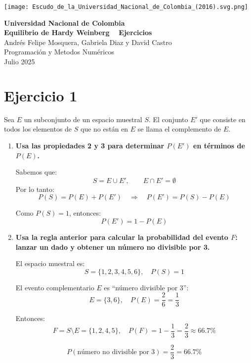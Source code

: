 \documentclass{article}
\begin{document}
\begin{titlepage}
    \begin{center}
        \vspace*{1cm}
        
        \texttt{[image: Escudo\_de\_la\_Universidad\_Nacional\_de\_Colombia\_(2016).svg.png]}
        
        \vspace{0.5cm}
        
        {\Large\textbf{Universidad Nacional de Colombia}}\\[1.5cm]
        
        {\Huge\textbf{Equilibrio de Hardy Weinberg ~ Ejercicios }}\\[2cm]
    
        
        {\large Andrés Felipe Mosquera, Gabriela Diaz y David Castro}\\[2cm]
        
        {\large Programación y Metodos Numéricos}\\[1.5cm]
        
        {\large Julio 2025}
        
    \end{center}
\end{titlepage}
\section*{Ejercicio 1}

Sea $E$ un subconjunto de un espacio muestral $S$. El conjunto $E'$ que consiste en todos los elementos de $S$ que no están en $E$ se llama el complemento de $E$.

\begin{enumerate}[label=\alph*)]
    \item \textbf{Usa las propiedades 2 y 3 para determinar $P(E')$ en términos de $P(E)$.}

    Sabemos que:
    \[
    S = E \cup E', \qquad E \cap E' = \emptyset
    \]
    Por lo tanto:
    \[
    P(S) = P(E) + P(E') \quad \Rightarrow \quad P(E') = P(S) - P(E)
    \]

    Como $P(S) = 1$, entonces:
    \[
    \boxed{P(E') = 1 - P(E)}
    \]

    \item \textbf{Usa la regla anterior para calcular la probabilidad del evento $F$: lanzar un dado y obtener un número no divisible por 3.}

    El espacio muestral es:
    \[
    S = \{1,2,3,4,5,6\}, \quad P(S) = 1
    \]

    El evento complementario $E$ es “número divisible por 3”:
    \[
    E = \{3,6\}, \quad P(E) = \frac{2}{6} = \frac{1}{3}
    \]

    Entonces:
    \[
    F = S \setminus E = \{1,2,4,5\}, \quad P(F) = 1 - \frac{1}{3} = \frac{2}{3} \approx 66.7\%
    \]

    \[
    \boxed{P(\text{número no divisible por 3}) = \frac{2}{3} = 66.7\%}
    \]
\end{enumerate}
\end{document}
